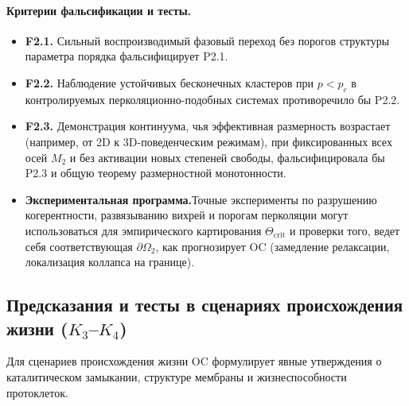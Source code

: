 \paragraph{Критерии фальсификации и тесты.}
\begin{itemize}
  \item \textbf{F2.1.}
        Сильный воспроизводимый фазовый переход без порогов структуры
        параметра порядка фальсифицирует P2.1.
  \item \textbf{F2.2.}
        Наблюдение устойчивых бесконечных кластеров при \(p<p_c\) в
        контролируемых перколяционно-подобных системах противоречило бы P2.2.
  \item \textbf{F2.3.}
        Демонстрация континуума, чья эффективная размерность возрастает
        (например, от 2D к 3D-поведенческим режимам), при фиксированных всех
        осей \(M_2\) и без активации новых степеней свободы, фальсифицировала
        бы P2.3 и общую теорему размерностной монотонности.
  \item \textbf{Экспериментальная программа.}\n        Точные эксперименты по разрушению когерентности, развязыванию вихрей и
        порогам перколяции могут использоваться для эмпирического картирования
        \(\Theta_{\mathrm{crit}}\) и проверки того, ведет себя
        соответствующая \(\partial\Omega_2\), как прогнозирует OC
        (замедление релаксации, локализация коллапса на границе).
\end{itemize}

\subsection{Предсказания и тесты в сценариях происхождения жизни
            (\texorpdfstring{$K_3$}{K\_3}--\texorpdfstring{$K_4$}{K\_4})}

Для сценариев происхождения жизни OC формулирует явные утверждения о
каталитическом замыкании, структуре мембраны и жизнеспособности
протоклеток.

